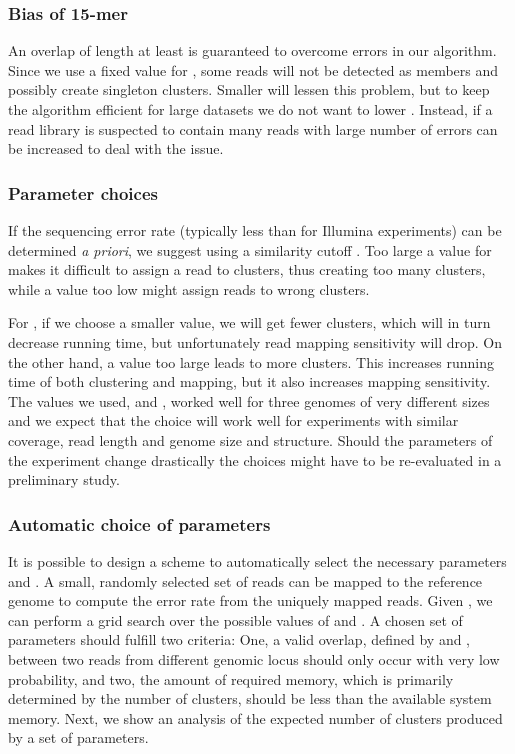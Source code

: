 \documentclass[a4paper]{article}
\begin{document}
\subsubsection*{Bias of 15-mer} 
An overlap of length at least  
is guaranteed to overcome  errors in our algorithm. Since we use a
fixed value for , some reads will not be detected as members and
possibly create singleton clusters. Smaller  will lessen this problem,
but to keep the algorithm efficient for large datasets we do not want
to lower . Instead, if a read library is suspected to contain many
reads with large number of errors  can be increased to deal with
the issue.

\subsubsection*{Parameter choices} 
\label{sec:params}
If the sequencing error rate 
(typically less than  for Illumina experiments) can be determined 
\emph{a priori}, 
we suggest using a similarity cutoff . Too 
large a value for  makes it difficult to assign a read to clusters, 
thus creating too many clusters,
while a value too low might assign reads to wrong clusters. 

For , if we choose a smaller value, we will get fewer clusters,
which will in turn decrease running time, but unfortunately read mapping 
sensitivity will drop. On the other hand, a value too large leads to more
clusters. This increases running time of both clustering and mapping,
but it also increases mapping sensitivity. The values we used,
 and , worked well for 
three genomes of very
different sizes and we expect that the choice will work well for
experiments with similar coverage, read length and genome size and
structure. Should the parameters of the experiment change drastically
the choices might have to be re-evaluated in a preliminary study.


\subsubsection*{Automatic choice of parameters} It is possible to design
a scheme to automatically select the necessary parameters  and
.  
A small, randomly selected set of reads can be mapped to the reference 
genome to compute the error rate  from the uniquely mapped reads.
Given , we can perform a grid search over the possible
values of  and . 
A chosen set of parameters should fulfill
two criteria: One, a valid overlap, defined by  and ,
between two reads from different genomic locus
should only occur with very low probability, 
and two, the amount of required memory,
which is primarily determined by the number of clusters, should be less
than the available system memory. Next, we show an analysis of the 
expected number of clusters produced by a set of parameters. 
\end{document}
